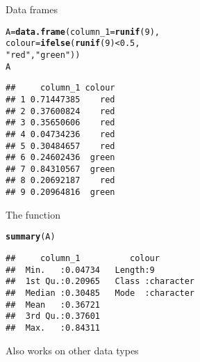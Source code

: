 \documentclass[aspectratio=169]{beamer}\usepackage[]{graphicx}\usepackage[]{xcolor}
\makeatletter
\newcommand{\hlnum}[1]{\textcolor[rgb]{0.686,0.059,0.569}{#1}}%
\newcommand{\hlsng}[1]{\textcolor[rgb]{0.192,0.494,0.8}{#1}}%
\newcommand{\hlopt}[1]{\textcolor[rgb]{0,0,0}{#1}}%
\newcommand{\hldef}[1]{\textcolor[rgb]{0.345,0.345,0.345}{#1}}%
\newcommand{\hlkwb}[1]{\textcolor[rgb]{0.69,0.353,0.396}{#1}}%
\newcommand{\hlkwc}[1]{\textcolor[rgb]{0.333,0.667,0.333}{#1}}%
\newcommand{\hlkwd}[1]{\textcolor[rgb]{0.737,0.353,0.396}{\textbf{#1}}}%
\newenvironment{kframe}{%
 \def\at@end@of@kframe{}%
 \ifinner\ifhmode%
  \def\at@end@of@kframe{\end{minipage}}%
  \begin{minipage}{\columnwidth}%
 \fi\fi%
 \def\FrameCommand##1{\hskip\@totalleftmargin \hskip-\fboxsep
 \colorbox{shadecolor}{##1}\hskip-\fboxsep
     \hskip-\linewidth \hskip-\@totalleftmargin \hskip\columnwidth}%
 \MakeFramed {\advance\hsize-\width
   \@totalleftmargin\z@ \linewidth\hsize
   \@setminipage}}%
 {\par\unskip\endMakeFramed%
 \at@end@of@kframe}
\newenvironment{knitrout}{}{} %
\makeatother
\begin{document}
\begin{frame}[fragile]{Data frames}
\begin{knitrout}
\color{fgcolor}\begin{kframe}
\begin{alltt}
\hldef{A} \hlkwb{=} \hlkwd{data.frame}\hldef{(}\hlkwc{column_1} \hldef{=} \hlkwd{runif}\hldef{(}\hlnum{9}\hldef{),}
               \hlkwc{colour} \hldef{=} \hlkwd{ifelse}\hldef{(}\hlkwd{runif}\hldef{(}\hlnum{9}\hldef{)} \hlopt{<} \hlnum{0.5}\hldef{,}
                               \hlsng{"red"}\hldef{,} \hlsng{"green"}\hldef{))}
\hldef{A}
\end{alltt}
\begin{verbatim}
##     column_1 colour
## 1 0.71447385    red
## 2 0.37600824    red
## 3 0.35650606    red
## 4 0.04734236    red
## 5 0.30484657    red
## 6 0.24602436  green
## 7 0.84310567  green
## 8 0.20692187    red
## 9 0.20964816  green
\end{verbatim}
\end{kframe}
\end{knitrout}
\end{frame}
  
\begin{frame}[fragile]{The  function}
\begin{knitrout}
\color{fgcolor}\begin{kframe}
\begin{alltt}
\hlkwd{summary}\hldef{(A)}
\end{alltt}
\begin{verbatim}
##     column_1          colour         
##  Min.   :0.04734   Length:9          
##  1st Qu.:0.20965   Class :character  
##  Median :0.30485   Mode  :character  
##  Mean   :0.36721                     
##  3rd Qu.:0.37601                     
##  Max.   :0.84311
\end{verbatim}
\end{kframe}
\end{knitrout}
\vfill
Also works on other data types
\end{frame}
\end{document}
